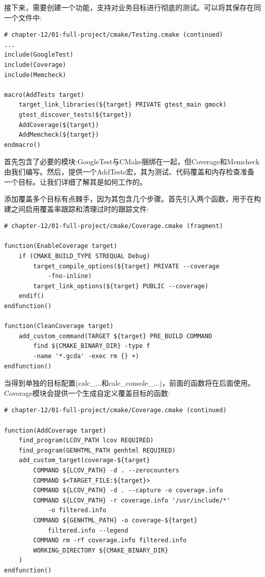 接下来，需要创建一个功能，支持对业务目标进行彻底的测试。可以将其保存在同一个文件中:

\begin{lstlisting}[style=styleCMake]
# chapter-12/01-full-project/cmake/Testing.cmake (continued)
...
include(GoogleTest)
include(Coverage)
include(Memcheck)

macro(AddTests target)
	target_link_libraries(${target} PRIVATE gtest_main gmock)
	gtest_discover_tests(${target})
	AddCoverage(${target})
	AddMemcheck(${target})
endmacro()
\end{lstlisting}

首先包含了必要的模块:GoogleTest与CMake捆绑在一起，但Coverage和Memcheck由我们编写。然后，提供一个AddTests宏，其为测试、代码覆盖和内存检查准备一个目标。让我们详细了解其是如何工作的。


添加覆盖多个目标有点棘手，因为其包含几个步骤。首先引入两个函数，用于在构建之间启用覆盖率跟踪和清理过时的跟踪文件:

\begin{lstlisting}[style=styleCMake]
# chapter-12/01-full-project/cmake/Coverage.cmake (fragment)

function(EnableCoverage target)
	if (CMAKE_BUILD_TYPE STREQUAL Debug)
		target_compile_options(${target} PRIVATE --coverage
			-fno-inline)
		target_link_options(${target} PUBLIC --coverage)
	endif()
endfunction()

function(CleanCoverage target)
	add_custom_command(TARGET ${target} PRE_BUILD COMMAND
		find ${CMAKE_BINARY_DIR} -type f
		-name '*.gcda' -exec rm {} +)
endfunction()
\end{lstlisting}

当得到单独的目标配置(calc\_...和calc\_console\_...)，前面的函数将在后面使用。Coverage模块会提供一个生成自定义覆盖目标的函数:

\begin{lstlisting}[style=styleCMake]
# chapter-12/01-full-project/cmake/Coverage.cmake (continued)

function(AddCoverage target)
	find_program(LCOV_PATH lcov REQUIRED)
	find_program(GENHTML_PATH genhtml REQUIRED)
	add_custom_target(coverage-${target}
		COMMAND ${LCOV_PATH} -d . --zerocounters
		COMMAND $<TARGET_FILE:${target}>
		COMMAND ${LCOV_PATH} -d . --capture -o coverage.info
		COMMAND ${LCOV_PATH} -r coverage.info '/usr/include/*'
			-o filtered.info
		COMMAND ${GENHTML_PATH} -o coverage-${target}
			filtered.info --legend
		COMMAND rm -rf coverage.info filtered.info
		WORKING_DIRECTORY ${CMAKE_BINARY_DIR}
	)
endfunction()
\end{lstlisting}

